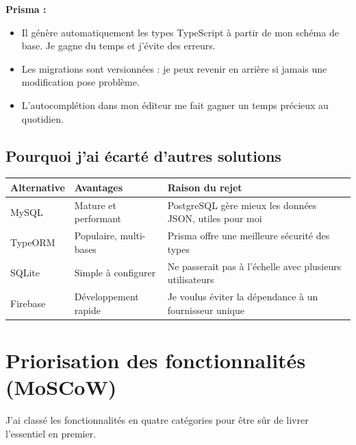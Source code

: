 \textbf{Prisma :}
\begin{itemize}
    \item Il génère automatiquement les types TypeScript à partir de mon schéma de base. Je gagne du temps et j'évite des erreurs.
    \item Les migrations sont versionnées : je peux revenir en arrière si jamais une modification pose problème.
    \item L'autocomplétion dans mon éditeur me fait gagner un temps précieux au quotidien.
\end{itemize}

\subsection*{Pourquoi j'ai écarté d'autres solutions}

\begin{center}
\begin{tabular}{|p{3cm}|p{4cm}|p{4cm}|}
\hline
\textbf{Alternative} & \textbf{Avantages} & \textbf{Raison du rejet} \\
\hline
MySQL & Mature et performant & PostgreSQL gère mieux les données JSON, utiles pour moi \\
\hline
TypeORM & Populaire, multi-bases & Prisma offre une meilleure sécurité des types \\
\hline
SQLite & Simple à configurer & Ne passerait pas à l'échelle avec plusieurs utilisateurs \\
\hline
Firebase & Développement rapide & Je voulus éviter la dépendance à un fournisseur unique \\
\hline
\end{tabular}
\end{center}

\section{Priorisation des fonctionnalités (MoSCoW)}

J'ai classé les fonctionnalités en quatre catégories pour être sûr de livrer l'essentiel en premier.

